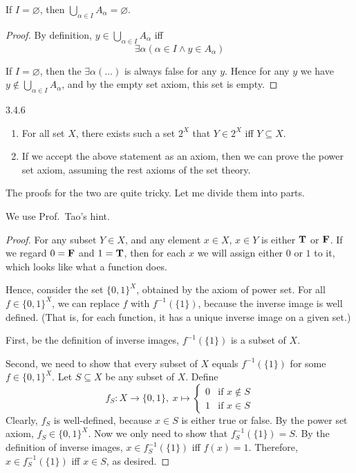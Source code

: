\begin{why}{50}
	If $I = \varnothing$, then $\bigcup_{\alpha \in I}A_\alpha = \varnothing$.
\end{why}
\begin{proof}
	By definition, $y \in \bigcup_{\alpha \in I}A_\alpha$ iff
	\[
		\exists \alpha (\alpha \in I \wedge y \in A_\alpha)
	\]
	
	If $I = \varnothing$, then the $\exists \alpha(\dots)$ is always false for any $y$. Hence for any $y$ we have $y \notin \bigcup_{\alpha \in I}A_\alpha$, and by the empty set axiom, this set is empty.
\end{proof}

\begin{exercise}{3.4.6}
	\begin{enumerate}
		\item For all set $X$, there exists such a set $2^X$ that $Y \in 2^X$ iff $Y \subseteq X$.
		\item If we accept the above statement as an axiom, then we can prove the power set axiom, assuming the rest axioms of the set theory.
	\end{enumerate}
\end{exercise}
The proofs for the two are quite tricky. Let me divide them into parts.

 We use Prof.~Tao's hint.
\begin{proof}
	For any subset $Y \in X$, and any element $x \in X$, $x \in Y$ is either $\mathbf{T}$ or $\mathbf{F}$. If we regard $0 = \mathbf{F}$ and $1 = \mathbf{T}$, then for each $x$ we will assign either $0$ or $1$ to it, which looks like what a function does.

	Hence,  consider the set $\{0,1\}^X$, obtained by the axiom of power set. For all $f \in \{0,1\}^X$, we can replace $f$ with $f^{-1}(\{1\})$, because the inverse image is well defined. (That is, for each function, it has a unique inverse image on a given set.)
	
	First, be the definition of inverse images, $f^{-1}(\{1\})$ is a subset of $X$.
	
	Second, we need to show that every subset of $X$ equals $f^{-1}(\{1\})$ for some $f \in \{0,1\}^X$. Let $S \subseteq X$ be any subset of $X$. Define
	\[
	f_S: X \to \{0,1\},\ x \mapsto
	\begin{cases}
		0 & \text{if } x \notin S \\
		1 & \text{if } x \in S
	\end{cases}
	\]
	Clearly, $f_S$ is well-defined, because $x \in S$ is either true or false. By the power set axiom, $f_S \in \{0,1\}^X$. Now we only need to show that $f_S^{-1}(\{1\}) = S$.	By the definition of inverse images, $x \in f_S^{-1}(\{1\})$ iff $f(x) = 1$. Therefore, $x \in f_S^{-1}(\{1\})$ iff $x \in S$, as desired.
\end{proof}

